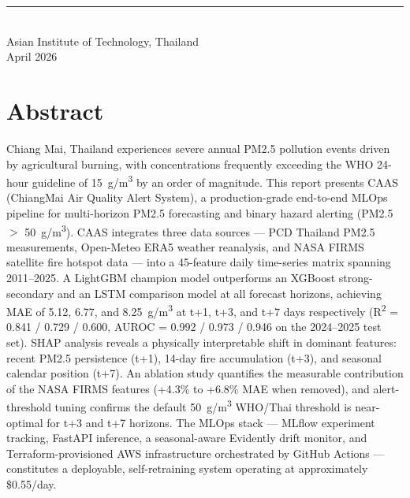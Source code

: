 \documentclass[11pt,a4paper]{report}
\begin{document}
\begin{titlepage}
\begin{center}
\vfill

\rule{0.5\textwidth}{0.4pt}\\[0.6em]
Asian Institute of Technology, Thailand \\[0.3em]
April 2026

\vspace{0.8cm}
\end{center}
\end{titlepage}





\chapter*{Abstract}

Chiang Mai, Thailand experiences severe annual PM2.5 pollution events driven by
agricultural burning, with concentrations frequently exceeding the WHO 24-hour
guideline of 15~\textmu g/m\textsuperscript{3} by an order of magnitude.
This report presents CAAS (ChiangMai Air Quality Alert System), a
production-grade end-to-end MLOps pipeline for multi-horizon PM2.5 forecasting
and binary hazard alerting (PM2.5 $>$ 50~\textmu g/m\textsuperscript{3}).
CAAS integrates three data sources --- PCD Thailand PM2.5 measurements,
Open-Meteo ERA5 weather reanalysis, and NASA FIRMS satellite fire hotspot data
--- into a 45-feature daily time-series matrix spanning 2011--2025.
A LightGBM champion model outperforms an XGBoost strong-secondary and an LSTM
comparison model at all forecast horizons, achieving MAE of 5.12, 6.77, and
8.25~\textmu g/m\textsuperscript{3} at t+1, t+3, and t+7 days respectively
(R\textsuperscript{2} = 0.841 / 0.729 / 0.600,
AUROC = 0.992 / 0.973 / 0.946 on the 2024--2025 test set).
SHAP analysis reveals a physically interpretable shift in dominant features:
recent PM2.5 persistence (t+1), 14-day fire accumulation (t+3), and seasonal
calendar position (t+7). An ablation study quantifies the measurable
contribution of the NASA FIRMS features (+4.3\% to +6.8\% MAE when removed),
and alert-threshold tuning confirms the default
50~\textmu g/m\textsuperscript{3} WHO/Thai threshold is near-optimal for t+3
and t+7 horizons.
The MLOps stack --- MLflow experiment tracking, FastAPI inference, a
seasonal-aware Evidently drift monitor, and Terraform-provisioned AWS
infrastructure orchestrated by GitHub Actions --- constitutes a deployable,
self-retraining system operating at approximately \$0.55/day.
\end{document}
